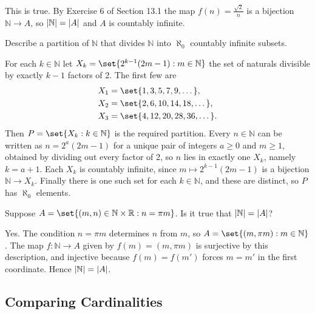 \documentclass[DIN, pagenumber=false, fontsize=11pt, parskip=half]{scrartcl}
\begin{document}
\begin{problems}
    \answer This is true. By Exercise 6 of Section 13.1 the map $f(n) = \frac{\sqrt{2}}{n}$ is a bijection $\mathbb{N} \to A$, so $\lvert \mathbb{N} \rvert = \lvert A \rvert$ and $A$ is countably infinite.

    \problem Describe a partition of $\mathbb{N}$ that divides $\mathbb{N}$ into $\aleph_0$ countably infinite subsets.

    \answer For each $k \in \mathbb{N}$ let $X_k = \set{2^{k-1}(2m-1) : m \in \mathbb{N}}$ the set of naturals divisible by exactly $k-1$ factors of 2. The first few are
    \begin{align*}
        X_1 &= \set{1,3,5,7,9,\dots},\\
        X_2 &= \set{2,6,10,14,18,\dots},\\
        X_3 &= \set{4,12,20,28,36,\dots}.
    \end{align*}
    Then $P = \set{X_k : k \in \mathbb{N}}$ is the required partition. Every $n \in \mathbb{N}$ can be written as $n = 2^a(2m-1)$ for a unique pair of integers $a \geq 0$ and $m \geq 1$, obtained by dividing out every factor of 2, so $n$ lies in exactly one $X_k$, namely $k = a+1$. Each $X_k$ is countably infinite, since $m \mapsto 2^{k-1}(2m-1)$ is a bijection $\mathbb{N} \to X_k$. Finally there is one such set for each $k \in \mathbb{N}$, and these are distinct, so $P$ has $\aleph_0$ elements.

    \problem Suppose $A = \set{(m,n) \in \mathbb{N} \times \mathbb{R} : n = \pi m}$. Is it true that $\lvert \mathbb{N} \rvert = \lvert A \rvert$?

    \answer Yes. The condition $n = \pi m$ determines $n$ from $m$, so $A = \set{(m, \pi m) : m \in \mathbb{N}}$. The map $f : \mathbb{N} \to A$ given by $f(m) = (m, \pi m)$ is surjective by this description, and injective because $f(m) = f(m')$ forces $m = m'$ in the first coordinate. Hence $\lvert \mathbb{N} \rvert = \lvert A \rvert$.
\end{problems}

\subsection{Comparing Cardinalities}
\end{document}
